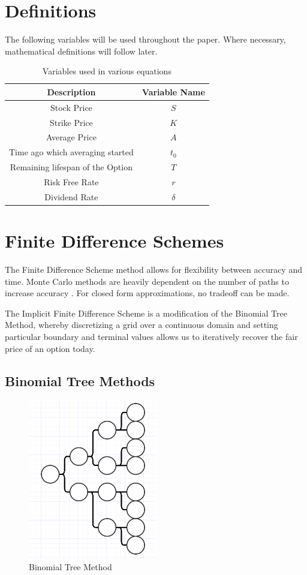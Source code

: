 \documentclass{article}
\begin{document}
\section{Definitions}
The following variables will be used throughout the paper. Where necessary, mathematical definitions will follow later.
\begin{table}[H]
  \begin{tabular}{|c|c|}
    \hline
    \textbf{Description} & \textbf{Variable Name} \\ \hline
    Stock Price & \(S\) \\
    Strike Price & \(K\)\\
    Average Price & \(A\) \\
    Time ago which averaging started & \(t_0\) \\
    Remaining lifespan of the Option & \(T\) \\
    Risk Free Rate & \(r\) \\
    Dividend Rate & \(\delta\) \\
    \hline
  \end{tabular}
  \caption{Variables used in various equations}
  \label{table:name}
\end{table}

\section{Finite Difference Schemes}

The Finite Difference Scheme method allows for flexibility between accuracy and time. Monte Carlo methods are heavily dependent on the number of paths to increase accuracy \cite{montecarlo}. For closed form approximations, no tradeoff can be made.

The Implicit Finite Difference Scheme is a modification of the Binomial Tree Method, whereby discretizing a grid over a continuous domain and setting particular boundary and terminal values allows us to iteratively recover the fair price of an option today.

\subsection{Binomial Tree Methods}
\begin{figure}[H]
  \includegraphics[width=0.5\textwidth]{btm}
  \caption{Binomial Tree Method}
  \label{figure:name}
\end{figure}
\end{document}
